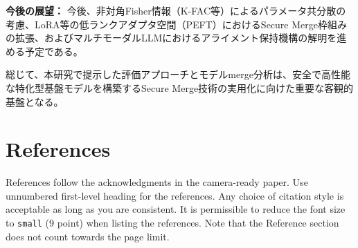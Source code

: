 \documentclass{article}
\begin{document}
\textbf{今後の展望：}
今後、非対角Fisher情報（K-FAC等）によるパラメータ共分散の考慮、LoRA等の低ランクアダプタ空間（PEFT）におけるSecure Merge枠組みの拡張、およびマルチモーダルLLMにおけるアライメント保持機構の解明を進める予定である。

総じて、本研究で提示した評価アプローチとモデルmerge分析は、安全で高性能な特化型基盤モデルを構築するSecure Merge技術の実用化に向けた重要な客観的基盤となる。


\section*{References}


References follow the acknowledgments in the camera-ready paper. Use unnumbered first-level heading for
the references. Any choice of citation style is acceptable as long as you are
consistent. It is permissible to reduce the font size to \verb+small+ (9 point)
when listing the references.
Note that the Reference section does not count towards the page limit.
\medskip
\end{document}
